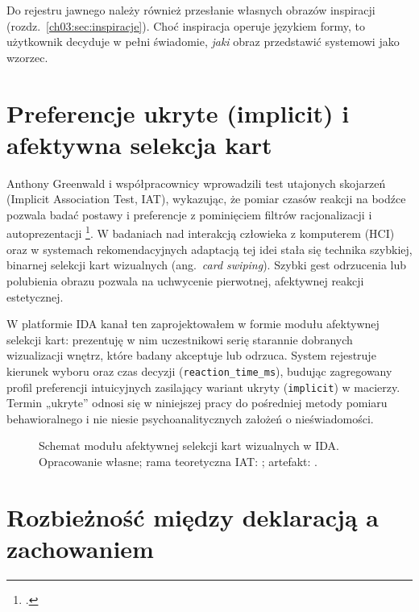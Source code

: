 Do rejestru jawnego należy również przesłanie własnych obrazów inspiracji (rozdz.~\ref{ch03:sec:inspiracje}). Choć inspiracja operuje językiem formy, to użytkownik decyduje w pełni świadomie, \emph{jaki} obraz przedstawić systemowi jako wzorzec.

\section{Preferencje ukryte (implicit) i afektywna selekcja kart}
\label{ch03:sec:implicit}

Anthony Greenwald i współpracownicy wprowadzili test utajonych skojarzeń (Implicit Association Test, IAT), wykazując, że pomiar czasów reakcji na bodźce pozwala badać postawy i preferencje z pominięciem filtrów racjonalizacji i autoprezentacji \footcite{greenwald1998iat}.
W badaniach nad interakcją człowieka z komputerem (HCI) oraz w systemach rekomendacyjnych adaptacją tej idei stała się technika szybkiej, binarnej selekcji kart wizualnych (ang.\ \emph{card swiping}). Szybki gest odrzucenia lub polubienia obrazu pozwala na uchwycenie pierwotnej, afektywnej reakcji estetycznej.

W platformie IDA kanał ten zaprojektowałem w formie modułu afektywnej selekcji kart: prezentuję w nim uczestnikowi serię starannie dobranych wizualizacji wnętrz, które badany akceptuje lub odrzuca. System rejestruje kierunek wyboru oraz czas decyzji (\texttt{reaction\_time\_ms}), budując zagregowany profil preferencji intuicyjnych zasilający wariant ukryty (\texttt{implicit}) w macierzy.
Termin „ukryte” odnosi się w niniejszej pracy do pośredniej metody pomiaru behawioralnego i nie niesie psychoanalitycznych założeń o nieświadomości.

\begin{figure}[htbp]
  \centering
  \caption[Schemat modułu afektywnej selekcji kart wizualnych w IDA. Opracowanie własne; rama teoretyczna IAT: Greenwald, McGhee i Schwartz; artefakt IDA.]{Schemat modułu afektywnej selekcji kart wizualnych w IDA.
    Opracowanie własne; rama teoretyczna IAT: \textcite{greenwald1998iat}; artefakt: \cite{idaPlatform2026}.}
  \label{fig:ch03:tinder-iat}
\end{figure}

\section{Rozbieżność między deklaracją a zachowaniem}
\label{ch03:sec:rozbieznosci}

